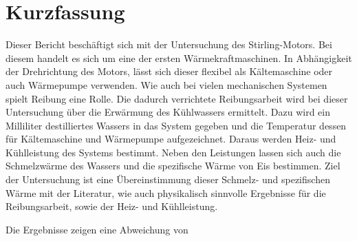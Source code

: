 \section{Kurzfassung}

Dieser Bericht beschäftigt sich mit der Untersuchung des Stirling-Motors.
Bei diesem handelt es sich um eine der ersten Wärmekraftmaschinen.
In Abhängigkeit der Drehrichtung des Motors, lässt sich dieser flexibel als Kältemaschine oder auch Wärmepumpe verwenden.
Wie auch bei vielen mechanischen Systemen spielt Reibung eine Rolle.
Die dadurch verrichtete Reibungsarbeit wird bei dieser Untersuchung über die Erwärmung des Kühlwassers ermittelt.
Dazu wird ein Milliliter destilliertes Wassers in das System gegeben und die Temperatur dessen für Kältemaschine und Wärmepumpe aufgezeichnet.
Daraus werden Heiz- und Kühlleistung des Systems bestimmt.
Neben den Leistungen lassen sich auch die Schmelzwärme des Wassers und die spezifische Wärme von Eis bestimmen.
Ziel der Untersuchung ist eine Übereinstimmung dieser Schmelz- und spezifischen Wärme mit der Literatur, wie auch physikalisch sinnvolle Ergebnisse für die Reibungsarbeit, sowie der Heiz- und Kühlleistung.

Die Ergebnisse zeigen eine Abweichung von %